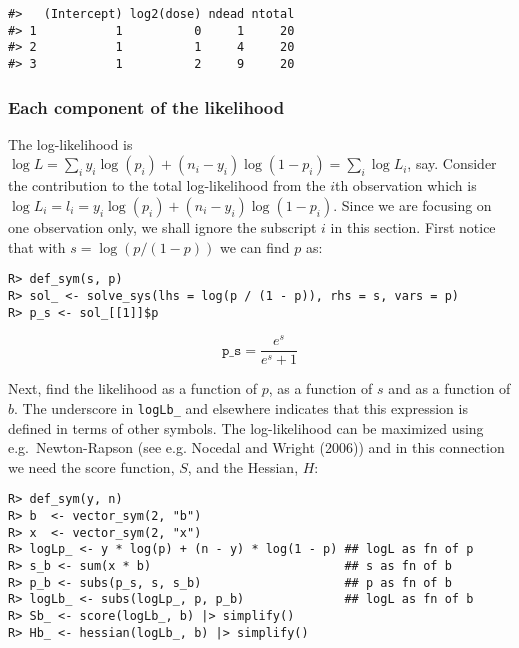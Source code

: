 \begin{verbatim}
#>   (Intercept) log2(dose) ndead ntotal
#> 1           1          0     1     20
#> 2           1          1     4     20
#> 3           1          2     9     20
\end{verbatim}

\hypertarget{each-component-of-the-likelihood}{%
\subsubsection{Each component of the likelihood}\label{each-component-of-the-likelihood}}

The log-likelihood is \(\log L=\sum_i y_i \log(p_i) + (n_i-y_i) \log(1-p_i) = \sum_i \log L_i\), say.
Consider the contribution to the total log-likelihood from the \(i\)th
observation which is \(\log L_i = l_i = y_i \log(p_i) + (n_i-y_i) \log(1-p_i)\).
Since we are focusing on one observation only, we shall ignore the
subscript \(i\) in this section. First notice that with
\(s = \log(p/(1-p))\) we can find \(p\) as:

\begin{verbatim}
R> def_sym(s, p)
R> sol_ <- solve_sys(lhs = log(p / (1 - p)), rhs = s, vars = p)
R> p_s <- sol_[[1]]$p
\end{verbatim}

\[
\texttt{p\_s} = \frac{e^{s}}{e^{s} + 1}
\]

Next, find the likelihood as a function of \(p\), as a function of \(s\)
and as a function of \(b\). The underscore in \texttt{logLb\_} and elsewhere
indicates that this expression is defined in terms of other
symbols. The log-likelihood can be maximized using e.g.~Newton-Rapson
(see e.g. Nocedal and Wright (2006)) and in this connection we need the score function,
\(S\), and the Hessian, \(H\):

\begin{verbatim}
R> def_sym(y, n)
R> b  <- vector_sym(2, "b")
R> x  <- vector_sym(2, "x")
R> logLp_ <- y * log(p) + (n - y) * log(1 - p) ## logL as fn of p
R> s_b <- sum(x * b)                           ## s as fn of b
R> p_b <- subs(p_s, s, s_b)                    ## p as fn of b
R> logLb_ <- subs(logLp_, p, p_b)              ## logL as fn of b
R> Sb_ <- score(logLb_, b) |> simplify()
R> Hb_ <- hessian(logLb_, b) |> simplify()
\end{verbatim}

